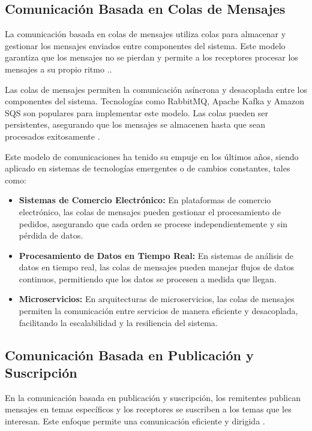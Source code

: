 		\subsection{Comunicación Basada en Colas de Mensajes}
			La comunicación basada en colas de mensajes utiliza colas para almacenar y gestionar los mensajes enviados entre componentes del sistema. Este modelo garantiza que los mensajes no se pierdan y permite a los receptores procesar los mensajes a su propio ritmo \cite{Urquhart2021flow,Hogie2023,Donta2022}..
			
			Las colas de mensajes permiten la comunicación asíncrona y desacoplada entre los componentes del sistema. Tecnologías como RabbitMQ, Apache Kafka y Amazon SQS son populares para implementar este modelo. Las colas pueden ser persistentes, asegurando que los mensajes se almacenen hasta que sean procesados exitosamente \cite{Pilyai2024Implementation}.
			
			Este modelo de comunicaciones ha tenido su empuje en los últimos años, siendo aplicado en sistemas de tecnologías emergentes o de cambios constantes, tales como: 
			
			\begin{itemize}
				\item \textbf{Sistemas de Comercio Electrónico:} En plataformas de comercio electrónico, las colas de mensajes pueden gestionar el procesamiento de pedidos, asegurando que cada orden se procese independientemente y sin pérdida de datos.
				\item \textbf{Procesamiento de Datos en Tiempo Real:} En sistemas de análisis de datos en tiempo real, las colas de mensajes pueden manejar flujos de datos continuos, permitiendo que los datos se procesen a medida que llegan.
				\item \textbf{Microservicios:} En arquitecturas de microservicios, las colas de mensajes permiten la comunicación entre servicios de manera eficiente y desacoplada, facilitando la escalabilidad y la resiliencia del sistema.
			\end{itemize}
			
		\subsection{Comunicación Basada en Publicación y Suscripción}
			En la comunicación basada en publicación y suscripción, los remitentes publican mensajes en temas específicos y los receptores se suscriben a los temas que les interesan. Este enfoque permite una comunicación eficiente y dirigida \cite{Urquhart2021flow,Shang2019}.
			
